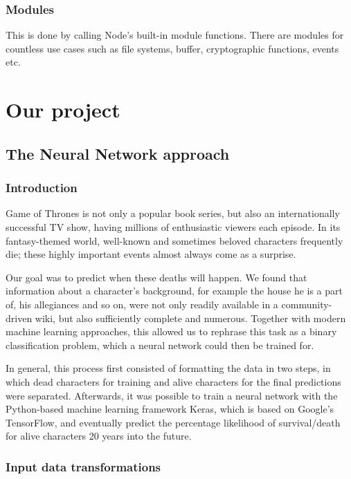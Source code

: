 \documentclass{bioinfo}
\begin{document}
\subsubsection{Modules}

This is done by calling Node's built-in module functions. There are modules for countless use cases such as file systems, buffer, cryptographic functions, events etc.   

\section{Our project}

\subsection{The Neural Network approach}

\subsubsection{Introduction}

Game of Thrones is not only a popular book series, but also an internationally successful TV show, having millions of enthusiastic viewers each episode. In its fantasy-themed world, well-known and sometimes beloved characters frequently die; these highly important events almost always come as a surprise.

Our goal was to predict when these deaths will happen. We found that information about a character's background, for example the house he is a part of, his allegiances and so on, were not only readily available in a community-driven wiki, but also sufficiently complete and numerous. Together with modern machine learning approaches, this allowed us to rephrase this task as a binary classification problem, which a neural network could then be trained for.

In general, this process first consisted of formatting the data in two steps, in which dead characters for training and alive characters for the final predictions were separated. Afterwards, it was possible to train a neural network with the Python-based machine learning framework Keras, which is based on Google's TensorFlow, and eventually predict the percentage likelihood of survival/death for alive characters 20 years into the future.

\subsubsection{Input data transformations}
\end{document}
